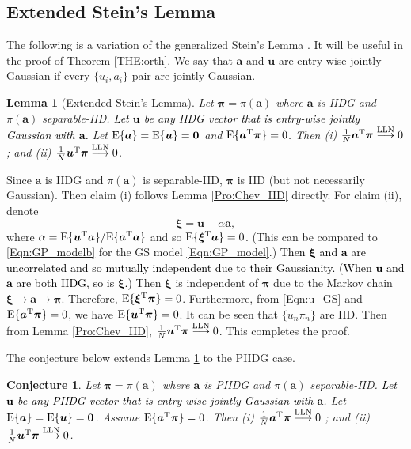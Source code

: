 \documentclass[journal]{IEEEtran}
\newcommand{\mr}{\mathrm}
\newcommand{\BE}{\begin{equation}}
\newcommand{\EE}{\end{equation}}
\renewcommand{\bf}{\bm}
\newtheorem{lemma}[theorem]{Lemma}
\newtheorem{conjecture}[theorem]{Conjecture}
\newcommand{\LLC}[1]{\textcolor{black}{#1}}%
\begin{document}
\subsection{Extended Stein’s Lemma} 

The following is a variation of the generalized Stein’s Lemma \cite{Stein1981}. It will be useful in the proof of Theorem \ref{THE:orth}. We say that $\bf{a}$ and $\bf{u}$ are entry-wise jointly Gaussian if every $\{u_i, a_i\}$ pair are jointly Gaussian.

\begin{lemma}[Extended Stein's Lemma]\label{Pro:ESteinLemma}
    Let $\bf{\pi}=\pi(\bf{a})$ where $\bf{a}$ is IIDG and $\pi(\bf{a})$ separable-IID. \LLC{Let $\bf{u}$ be any IIDG vector that is entry-wise jointly Gaussian with $\bf{a}$.} Let ${\rm E}\{\bf{a}\}= {\rm E}\{\bf{u}\}=\bf{0}$ and ${\rm E}\{\bf{a}^{\rm T}\bf{\pi}\}=0$. Then (i) $\tfrac{1}{N}\bf{a}^{\rm T}\bf{\pi}\overset{\rm LLN}{\longrightarrow} 0$; and (ii)  $\tfrac{1}{N}\bf{u}^{\rm T}\bf{\pi}\overset{\rm LLN}{\longrightarrow} 0$.
\end{lemma}

\begin{IEEEproof}
Since $\bf{a}$ is IIDG and $\pi(\bf{a})$ is separable-IID, $\bf{\pi}$ is IID (but not necessarily Gaussian). Then claim (i) follows Lemma \ref{Pro:Chev_IID} directly. For claim (ii), denote 
\BE\label{Eqn:u_GS}
\bf{\xi} =\bf{u}-\alpha \bf{a},
\EE
where $\alpha = {\mr E}\{\bf{u}^{\rm T}\bf{a}\}/{\mr E}\{\bf{a}^{\rm T}\bf{a}\}$ and so ${\mr E}\{\bf{\xi}^{\rm T}\bf{a}\}=0$. (This can be compared to \eqref{Eqn:GP_modelb} for the GS model \eqref{Eqn:GP_model}.) \LLC{Then $\bf{\xi}$ and $\bf{a}$ are uncorrelated and so mutually independent due to their Gaussianity. (When $\bf{u}$  and $\bf{a}$ are both IIDG, so is $\bf{\xi}$.)} Then $\bf{\xi}$  is independent of $\bf{\pi}$ due to the Markov chain $\bf{\xi}\to\bf{a}\to\bf{\pi}$. Therefore, ${\mr E}\{\bf{\xi}^{\rm T}\bf{\pi}\}=0$. Furthermore, from \eqref{Eqn:u_GS} and ${\mr E}\{\bf{a}^{\rm T}\bf{\pi}\}=0$, we have ${\rm E}\{\bf{u}^{\rm T}\bf{\pi}\}=0$. It can be seen that $\{u_n \pi_n\}$ are IID. Then from Lemma \ref{Pro:Chev_IID}, $\tfrac{1}{N}\bf{u}^{\rm T}\bf{\pi}\overset{\rm LLN}{\longrightarrow} 0$. This completes the proof.  
\end{IEEEproof} 

The conjecture below extends Lemma \ref{Pro:ESteinLemma}  to the PIIDG case.  

 \begin{conjecture}\label{Conj:ESteinLemma_PIIDG}
    Let $\bf{\pi}=\pi(\bf{a})$ where $\bf{a}$ is PIIDG and $\pi(\bf{a})$ separable-IID. \LLC{Let $\bf{u}$ be any PIIDG vector that is entry-wise jointly Gaussian with $\bf{a}$.} Let ${\rm E}\{\bf{a}\}= {\rm E}\{\bf{u}\}=\bf{0}$. Assume ${\rm E}\{\bf{a}^{\rm T}\bf{\pi}\}=0$. Then (i) $\tfrac{1}{N}\bf{a}^{\rm T}\bf{\pi}\overset{\rm LLN}{\longrightarrow} 0$ ; and (ii)  $\tfrac{1}{N}\bf{u}^{\rm T}\bf{\pi}\overset{\rm LLN}{\longrightarrow} 0$.
\end{conjecture}
 
\end{document}

